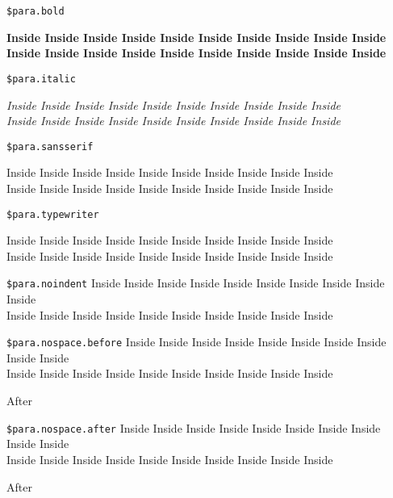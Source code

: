 \documentclass[demo]{pyscribe}
\begin{document}
\par\medskip
\texttt{\$para.bold} \par{\bfseries
Inside Inside Inside Inside Inside Inside Inside Inside Inside Inside  \\ Inside Inside Inside Inside Inside Inside Inside Inside Inside Inside  \\ \par}
\par\medskip
\texttt{\$para.italic} \par{\itshape
Inside Inside Inside Inside Inside Inside Inside Inside Inside Inside  \\ Inside Inside Inside Inside Inside Inside Inside Inside Inside Inside  \\ \par}
\par\medskip
\texttt{\$para.sansserif} \par{\sf
Inside Inside Inside Inside Inside Inside Inside Inside Inside Inside  \\ Inside Inside Inside Inside Inside Inside Inside Inside Inside Inside  \\ \par}
\par\medskip
\texttt{\$para.typewriter} \par{\ttfamily
Inside Inside Inside Inside Inside Inside Inside Inside Inside Inside  \\ Inside Inside Inside Inside Inside Inside Inside Inside Inside Inside  \\ \par}
\par\medskip
\texttt{\$para.noindent} \noindent Inside Inside Inside Inside Inside Inside Inside Inside Inside Inside  \\ Inside Inside Inside Inside Inside Inside Inside Inside Inside Inside  \\
\par\medskip
\texttt{\$para.nospace.before} \vspace{-\parskip}Inside Inside Inside Inside Inside Inside Inside Inside Inside Inside  \\ Inside Inside Inside Inside Inside Inside Inside Inside Inside Inside  \\ \par After \par
\par\medskip
\texttt{\$para.nospace.after} \vspace{-\parskip}Inside Inside Inside Inside Inside Inside Inside Inside Inside Inside  \\ Inside Inside Inside Inside Inside Inside Inside Inside Inside Inside  \\ \par After \par
\end{document}
